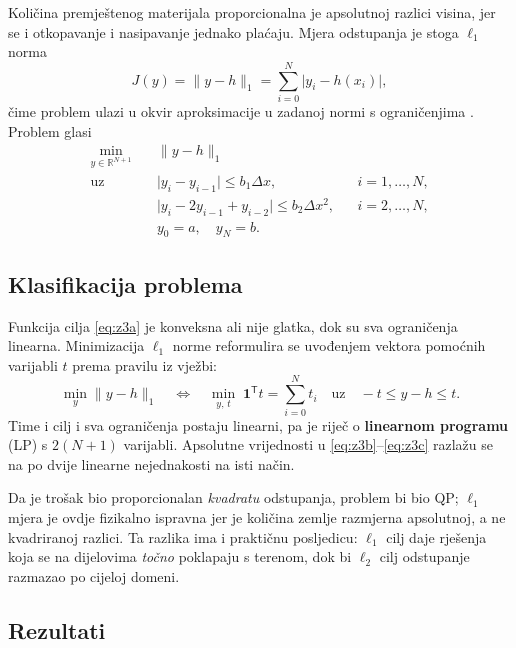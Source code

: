Količina premještenog materijala proporcionalna je apsolutnoj razlici visina,
jer se i otkopavanje i nasipavanje jednako plaćaju. Mjera odstupanja je stoga
$\ell_1$ norma
\begin{equation}
  J(y) = \lVert y - h \rVert_1 = \sum_{i=0}^{N} \lvert y_i - h(x_i)\rvert ,
  \label{eq:z3cost}
\end{equation}
čime problem ulazi u okvir aproksimacije u zadanoj normi s ograničenjima
\cite[str.~4, 14]{jokic_lpqp}. Problem glasi
\begin{align}
  \min_{y \in \mathbb{R}^{N+1}}\quad & \lVert y - h \rVert_1 \label{eq:z3a}\\
  \text{uz}\quad & \lvert y_i - y_{i-1}\rvert \le b_1 \Delta x, && i = 1,\dots,N, \label{eq:z3b}\\
                 & \lvert y_i - 2y_{i-1} + y_{i-2}\rvert \le b_2 \Delta x^2, && i = 2,\dots,N, \label{eq:z3c}\\
                 & y_0 = a, \quad y_N = b . \label{eq:z3d}
\end{align}

\subsection{Klasifikacija problema}
\label{sec:zad3:klasa}

Funkcija cilja \eqref{eq:z3a} je konveksna ali nije glatka, dok su sva
ograničenja linearna. Minimizacija $\ell_1$ norme reformulira se uvođenjem
vektora pomoćnih varijabli $t$ prema pravilu iz vježbi:
\begin{equation}
  \min_y \lVert y - h\rVert_1
  \quad\Longleftrightarrow\quad
  \min_{y,\,t}\; \mathbf{1}^{\mathsf T}t = \sum_{i=0}^{N} t_i
  \quad \text{uz} \quad -t \le y - h \le t .
  \label{eq:z3epi}
\end{equation}
Time i cilj i sva ograničenja postaju linearni, pa je riječ o
\textbf{linearnom programu} (LP) \cite[str.~30]{jokic_lpqp} s $2(N+1)$ varijabli.
Apsolutne vrijednosti u \eqref{eq:z3b}--\eqref{eq:z3c} razlažu se na po dvije
linearne nejednakosti na isti način.

Da je trošak bio proporcionalan \emph{kvadratu} odstupanja, problem bi bio QP;
$\ell_1$ mjera je ovdje fizikalno ispravna jer je količina zemlje razmjerna
apsolutnoj, a ne kvadriranoj razlici. Ta razlika ima i praktičnu posljedicu:
$\ell_1$ cilj daje rješenja koja se na dijelovima \emph{točno} poklapaju s
terenom, dok bi $\ell_2$ cilj odstupanje razmazao po cijeloj domeni.

\subsection{Rezultati}
\label{sec:zad3:rezultati}

